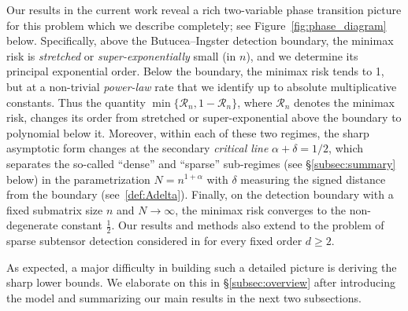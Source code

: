 \documentclass[11pt,reqno,letterpaper]{amsart}
\numberwithin{equation}{section}
\theoremstyle{plain}
\begin{document}
\vspace{0.1cm}

Our results in the current work reveal a rich two-variable phase transition picture 
for this problem which we describe completely; see Figure~\ref{fig:phase_diagram} 
below. Specifically, above the Butucea--Ingster detection boundary, the minimax risk is {\em stretched} or {\em super-exponentially} small (in $n$), and we determine its principal exponential order. Below the boundary, the minimax risk 
tends to 1, but at a non-trivial {\em power-law} rate that we identify up to 
absolute multiplicative constants. Thus the quantity $\min\{\mathcal R_n,1-\mathcal R_n\}$, where $\mathcal R_n$ denotes the minimax risk, changes its order from stretched or super-exponential above the boundary to polynomial below it. 
Moreover, within each of these two regimes, the sharp asymptotic form changes at the secondary {\em critical  line} $\alpha + \delta = 1/2$, which separates the so-called ``dense'' and ``sparse'' sub-regimes (see \S\ref{subsec:summary} below) in the parametrization $N = n^{1+\alpha}$ with $\delta$ measuring 
the signed distance from the boundary (see~\eqref{def:Adelta}). Finally, on the detection boundary with a fixed submatrix size $n$ and $N \to \infty$,  the minimax risk 
converges to the non-degenerate constant $\frac12$. Our results and methods also extend 
to the problem of sparse subtensor detection considered in \cite{MR4382029} for every 
fixed order $d \ge 2$. %


\vspace{0.1cm}

As expected, a major difficulty in building such a detailed picture is deriving the sharp lower 
bounds. We elaborate on this in \S\ref{subsec:overview} after introducing the model 
and summarizing our main results in the next two subsections.
\end{document}

